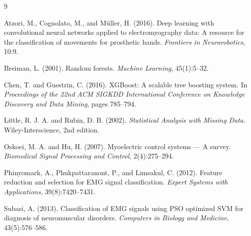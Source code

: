 \documentclass[11pt,a4paper]{article}
\begin{document}
\begin{thebibliography}{9}

Atzori, M., Cognolato, M., and M\"{u}ller, H. (2016).
Deep learning with convolutional neural networks applied to electromyography data: A resource for the classification of movements for prosthetic hands.
\emph{Frontiers in Neurorobotics}, 10:9.

Breiman, L. (2001).
Random forests.
\emph{Machine Learning}, 45(1):5--32.

Chen, T. and Guestrin, C. (2016).
XGBoost: A scalable tree boosting system.
In \emph{Proceedings of the 22nd ACM SIGKDD International Conference on Knowledge Discovery and Data Mining}, pages 785--794.

Little, R. J. A. and Rubin, D. B. (2002).
\emph{Statistical Analysis with Missing Data}.
Wiley-Interscience, 2nd edition.

Oskoei, M. A. and Hu, H. (2007).
Myoelectric control systems --- A survey.
\emph{Biomedical Signal Processing and Control}, 2(4):275--294.

Phinyomark, A., Phukpattaranont, P., and Limsakul, C. (2012).
Feature reduction and selection for EMG signal classification.
\emph{Expert Systems with Applications}, 39(8):7420--7431.

Subasi, A. (2013).
Classification of EMG signals using PSO optimized SVM for diagnosis of neuromuscular disorders.
\emph{Computers in Biology and Medicine}, 43(5):576--586.

\end{thebibliography}
\end{document}
